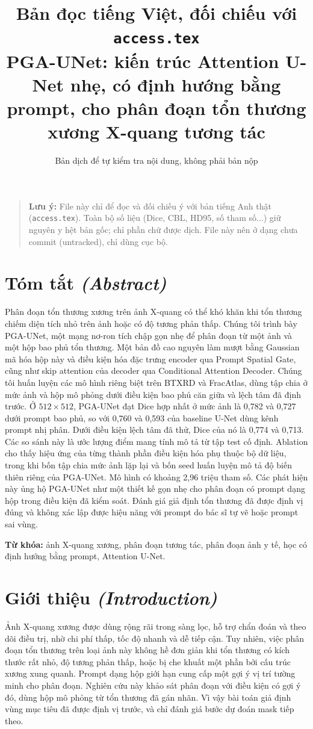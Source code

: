 \documentclass[11pt]{article}
\title{\textbf{Bản đọc tiếng Việt, đối chiếu với \texttt{access.tex}}\\[4pt]
\large PGA-UNet: kiến trúc Attention U-Net nhẹ, có định hướng bằng prompt, cho phân đoạn tổn thương xương X-quang tương tác}
\author{Bản dịch để tự kiểm tra nội dung, không phải bản nộp}
\date{}
\newcommand{\enlabel}[1]{{\small\itshape\color{gray} (#1)}}
\begin{document}
\maketitle

\begin{quote}
\small\color{gray}
\textbf{Lưu ý:} File này chỉ để đọc và đối chiếu ý với bản tiếng Anh thật (\texttt{access.tex}). Toàn bộ số liệu (Dice, CBL, HD95, số tham số...) giữ nguyên y hệt bản gốc; chỉ phần chữ được dịch. File này nên ở dạng chưa commit (untracked), chỉ dùng cục bộ.
\end{quote}

\section*{Tóm tắt \enlabel{Abstract}}
Phân đoạn tổn thương xương trên ảnh X-quang có thể khó khăn khi tổn thương chiếm diện tích nhỏ trên ảnh hoặc có độ tương phản thấp. Chúng tôi trình bày PGA-UNet, một mạng nơ-ron tích chập gọn nhẹ để phân đoạn từ một ảnh và một hộp bao phủ tổn thương. Một bản đồ cao nguyên làm mượt bằng Gaussian mã hóa hộp này và điều kiện hóa đặc trưng encoder qua Prompt Spatial Gate, cũng như skip attention của decoder qua Conditional Attention Decoder. Chúng tôi huấn luyện các mô hình riêng biệt trên BTXRD và FracAtlas, dùng tập chia ở mức ảnh và hộp mô phỏng dưới điều kiện bao phủ căn giữa và lệch tâm đã định trước. Ở $512\times512$, PGA-UNet đạt Dice hợp nhất ở mức ảnh là 0,782 và 0,727 dưới prompt bao phủ, so với 0,760 và 0,593 của baseline U-Net dùng kênh prompt nhị phân. Dưới điều kiện lệch tâm đã thử, Dice của nó là 0,774 và 0,713. Các so sánh này là ước lượng điểm mang tính mô tả từ tập test cố định. Ablation cho thấy hiệu ứng của từng thành phần điều kiện hóa phụ thuộc bộ dữ liệu, trong khi bốn tập chia mức ảnh lặp lại và bốn seed huấn luyện mô tả độ biến thiên riêng của PGA-UNet. Mô hình có khoảng 2,96 triệu tham số. Các phát hiện này ủng hộ PGA-UNet như một thiết kế gọn nhẹ cho phân đoạn có prompt dạng hộp trong điều kiện đã kiểm soát. Đánh giá giả định tổn thương đã được định vị đúng và không xác lập được hiệu năng với prompt do bác sĩ tự vẽ hoặc prompt sai vùng.

\textbf{Từ khóa:} ảnh X-quang xương, phân đoạn tương tác, phân đoạn ảnh y tế, học có định hướng bằng prompt, Attention U-Net.

\section{Giới thiệu \enlabel{Introduction}}
Ảnh X-quang xương được dùng rộng rãi trong sàng lọc, hỗ trợ chẩn đoán và theo dõi điều trị, nhờ chi phí thấp, tốc độ nhanh và dễ tiếp cận. Tuy nhiên, việc phân đoạn tổn thương trên loại ảnh này không hề đơn giản khi tổn thương có kích thước rất nhỏ, độ tương phản thấp, hoặc bị che khuất một phần bởi cấu trúc xương xung quanh. Prompt dạng hộp giới hạn cung cấp một gợi ý vị trí tường minh cho phân đoạn. Nghiên cứu này khảo sát phân đoạn với điều kiện có gợi ý đó, dùng hộp mô phỏng từ tổn thương đã gán nhãn. Vì vậy bài toán giả định vùng mục tiêu đã được định vị trước, và chỉ đánh giá bước dự đoán mask tiếp theo.
\end{document}
